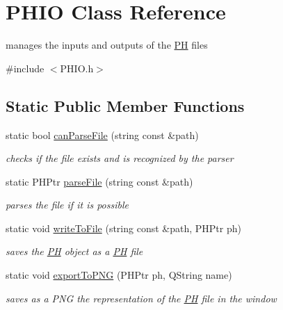 \hypertarget{class_p_h_i_o}{\section{\-P\-H\-I\-O \-Class \-Reference}
\label{class_p_h_i_o}
}


manages the inputs and outputs of the \hyperlink{class_p_h}{\-P\-H} files  




{\ttfamily \#include $<$\-P\-H\-I\-O.\-h$>$}

\subsection*{\-Static \-Public \-Member \-Functions}
\begin{DoxyCompactItemize}
\item 
static bool \hyperlink{class_p_h_i_o_a264cd5b35169906843e829a13cbcc09d}{can\-Parse\-File} (string const \&path)
\begin{DoxyCompactList}\small\item\em checks if the file exists and is recognized by the parser \end{DoxyCompactList}\item 
static \-P\-H\-Ptr \hyperlink{class_p_h_i_o_afeb84bb5b7960b8a4733b7345d2db025}{parse\-File} (string const \&path)
\begin{DoxyCompactList}\small\item\em parses the file if it is possible \end{DoxyCompactList}\item 
static void \hyperlink{class_p_h_i_o_a8a33a5a439f19caf0619ab7132642846}{write\-To\-File} (string const \&path, \-P\-H\-Ptr ph)
\begin{DoxyCompactList}\small\item\em saves the \hyperlink{class_p_h}{\-P\-H} object as a \hyperlink{class_p_h}{\-P\-H} file \end{DoxyCompactList}\item 
static void \hyperlink{class_p_h_i_o_a612f877c6332f9d20d6ef8992c1681f3}{export\-To\-P\-N\-G} (\-P\-H\-Ptr ph, \-Q\-String name)
\begin{DoxyCompactList}\small\item\em saves as a \-P\-N\-G the representation of the \hyperlink{class_p_h}{\-P\-H} file in the window \end{DoxyCompactList}\end{DoxyCompactItemize}


